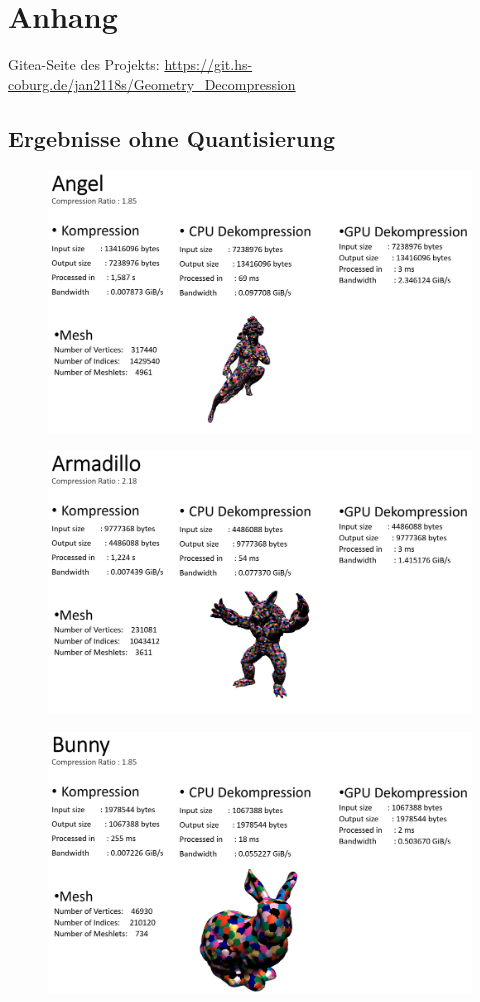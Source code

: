 \section{Anhang}
Gitea-Seite des Projekts: \url{https://git.hs-coburg.de/jan2118s/Geometry_Decompression}
\subsection{Ergebnisse ohne Quantisierung}
\begin{figure}[h]
  \centering  
  \includegraphics[scale=0.28]{Bilder/ergebnisse_full/angel.png}
\end{figure}
\begin{figure}[h]
  \centering  
  \includegraphics[scale=0.28]{Bilder/ergebnisse_full/armadillo.png}
\end{figure}
\begin{figure}[h]
  \centering  
  \includegraphics[scale=0.28]{Bilder/ergebnisse_full/bunny.png}
\end{figure}
